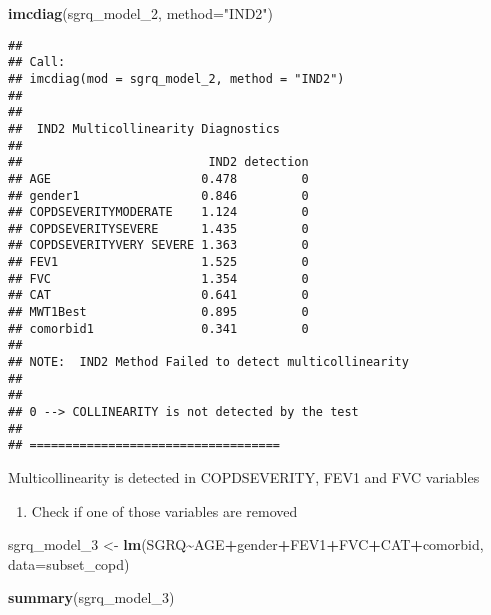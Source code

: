 \documentclass[
]{article}
\newenvironment{Shaded}{\begin{snugshade}}{\end{snugshade}}
\newcommand{\AttributeTok}[1]{\textcolor[rgb]{0.13,0.29,0.53}{#1}}
\newcommand{\FunctionTok}[1]{\textcolor[rgb]{0.13,0.29,0.53}{\textbf{#1}}}
\newcommand{\NormalTok}[1]{#1}
\newcommand{\OtherTok}[1]{\textcolor[rgb]{0.56,0.35,0.01}{#1}}
\newcommand{\SpecialCharTok}[1]{\textcolor[rgb]{0.81,0.36,0.00}{\textbf{#1}}}
\newcommand{\StringTok}[1]{\textcolor[rgb]{0.31,0.60,0.02}{#1}}
\providecommand{\tightlist}{%
  \setlength{\itemsep}{0pt}\setlength{\parskip}{0pt}}
\begin{document}
\begin{Shaded}
\begin{Highlighting}[]
\FunctionTok{imcdiag}\NormalTok{(sgrq\_model\_2, }\AttributeTok{method=}\StringTok{"IND2"}\NormalTok{)}
\end{Highlighting}
\end{Shaded}

\begin{verbatim}
## 
## Call:
## imcdiag(mod = sgrq_model_2, method = "IND2")
## 
## 
##  IND2 Multicollinearity Diagnostics
## 
##                          IND2 detection
## AGE                     0.478         0
## gender1                 0.846         0
## COPDSEVERITYMODERATE    1.124         0
## COPDSEVERITYSEVERE      1.435         0
## COPDSEVERITYVERY SEVERE 1.363         0
## FEV1                    1.525         0
## FVC                     1.354         0
## CAT                     0.641         0
## MWT1Best                0.895         0
## comorbid1               0.341         0
## 
## NOTE:  IND2 Method Failed to detect multicollinearity
## 
## 
## 0 --> COLLINEARITY is not detected by the test
## 
## ===================================
\end{verbatim}

Multicollinearity is detected in COPDSEVERITY, FEV1 and FVC variables

\begin{enumerate}
\def\labelenumi{\arabic{enumi}.}
\setcounter{enumi}{2}
\tightlist
\item
  Check if one of those variables are removed
\end{enumerate}

\begin{Shaded}
\begin{Highlighting}[]
\NormalTok{sgrq\_model\_3 }\OtherTok{\textless{}{-}} \FunctionTok{lm}\NormalTok{(SGRQ}\SpecialCharTok{\textasciitilde{}}\NormalTok{AGE}\SpecialCharTok{+}\NormalTok{gender}\SpecialCharTok{+}\NormalTok{FEV1}\SpecialCharTok{+}\NormalTok{FVC}\SpecialCharTok{+}\NormalTok{CAT}\SpecialCharTok{+}\NormalTok{comorbid, }\AttributeTok{data=}\NormalTok{subset\_copd)}
\end{Highlighting}
\end{Shaded}

\begin{Shaded}
\begin{Highlighting}[]
\FunctionTok{summary}\NormalTok{(sgrq\_model\_3)}
\end{Highlighting}
\end{Shaded}
\end{document}
